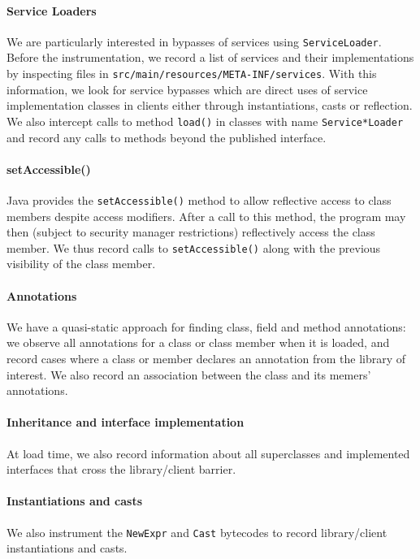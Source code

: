 \paragraph{Service Loaders} We are particularly interested in bypasses of 
services using \texttt{ServiceLoader}. Before the instrumentation, we record a list 
of services and their implementations by inspecting files in \texttt{src/main/resources/META-INF/services}.
With this information, we look for service bypasses which are direct uses of service implementation 
classes in clients either through instantiations, casts or reflection. We also intercept calls 
to method \texttt{load()} in classes with name \texttt{Service*Loader} and record any calls to methods beyond 
the published interface.

\paragraph{setAccessible()} 
Java provides the \texttt{setAccessible()} method to allow reflective access to class members despite
access modifiers. After a call to this method, the program may then (subject to security manager restrictions)
reflectively access the class member.
We thus record calls to \texttt{setAccessible()} along with the previous visibility of the class member.

\paragraph{Annotations} 
We have a quasi-static approach for finding class, field and method
annotations: we observe all annotations for a class or class member
when it is loaded, and record cases where a class or member declares an
annotation from the library of interest. We also record an association
between the class and its memers' annotations.

\paragraph{Inheritance and interface implementation} At load time,
we also record information about all superclasses and implemented interfaces
that cross the library/client barrier.

\paragraph{Instantiations and casts} We also instrument the
\texttt{NewExpr} and \texttt{Cast} bytecodes to record library/client 
instantiations and casts.



